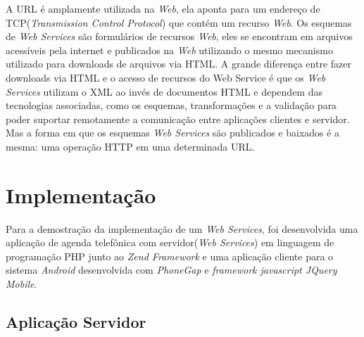 \documentclass{acm_proc_article-sp}
\begin{document}
			
			A URL é amplamente utilizada na \emph{Web}, ela aponta para um endereço de TCP(\emph{Transmission Control Protocol}) que contém um recurso \emph{Web}. Os esquemas de \emph{Web Services} são formulários de recursos \emph{Web}, eles se encontram em arquivos acessíveis pela internet e publicados na \emph{Web} utilizando o mesmo mecanismo utilizado para downloads de arquivos via HTML. A grande diferença entre fazer downloads via HTML e o acesso de recursos do Web Service é que os \emph{Web Services} utilizam o XML ao invés de documentos HTML e dependem das tecnologias associadas, como os esquemas, transformações e a validação para poder suportar remotamente a comunicação entre aplicações clientes e servidor. Mas a forma em que os esquemas \emph{Web Services} são publicados e baixados é a mesma: uma operação HTTP em uma determinada URL.
			
		
		
\section{Implementação}


	
	Para a demostração da implementação de um \emph{Web Services}, foi desenvolvida uma aplicação de agenda telefônica com servidor(\emph{Web Services}) em linguagem de programação PHP junto ao \emph{Zend Framework} e uma aplicação cliente para o sistema \emph{Android} desenvolvida com \emph{PhoneGap} e \emph{framework javascript JQuery Mobile}.
	
	\subsection{Aplicação Servidor}
\end{document}
